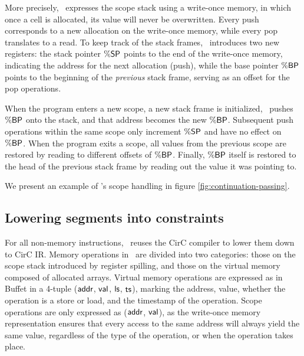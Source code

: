 More precisely, \CoBBl~expresses the scope stack using a write-once memory, in which once a cell is allocated, its value will never be overwritten. Every push corresponds to a new allocation on the write-once memory, while every pop translates to a read. To keep track of the stack frames, \CoBBl~introduces two new registers: the stack pointer $\sp$ points to the end of the write-once memory, indicating the address for the next allocation (push), while the base pointer $\bp$ points to the beginning of the \emph{previous} stack frame, serving as an offset for the pop operations.

When the program enters a new scope, a new stack frame is initialized, \CoBBl~pushes $\bp$ onto the stack, and that address becomes the new $\bp$. Subsequent push operations within the same scope only increment $\sp$ and have no effect on $\bp$. When the program exits a scope, all values from the previous scope are restored by reading to different offsets of $\bp$. Finally, $\bp$ itself is restored to the head of the previous stack frame by reading out the value it was pointing to.

We present an example of \CoBBl's scope handling in figure \ref{fig:continuation-passing}.



\subsection{Lowering segments into constraints} \label{sec:frontend_lowering}
For all non-memory instructions, \CoBBl~reuses the CirC compiler to lower them down to CirC IR. Memory operations in \CoBBl~are divided into two categories: those on the scope stack introduced by register spilling, and those on the virtual memory composed of allocated arrays. Virtual memory operations are expressed as in Buffet \cite{wahby14buffet} in a 4-tuple ($\addr$, $\val$, $\ls$, $\ts$), marking the address, value, whether the operation is a store or load, and the timestamp of the operation. Scope operations are only expressed as ($\addr$, $\val$), as the write-once memory representation ensures that every access to the same address will always yield the same value, regardless of the type of the operation, or when the operation takes place. 